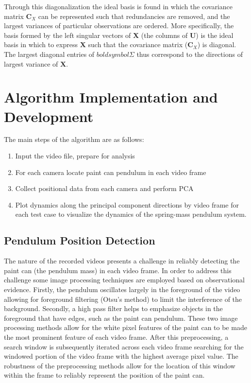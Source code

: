 \documentclass{article}
\begin{document}
Through this diagonalization the ideal basis is found in which the covariance matrix $\mathbf{C}_{X}$ can be represented such that redundancies are removed, and the largest variances of particular observations are ordered. More specifically, the basis formed by the left singular vectors of $\mathbf{X}$ (the columns of $\mathbf{U}$) is the ideal basis in which to express $\mathbf{X}$ such that the covariance matrix ($\mathbf{C}_{X}$) is diagonal. The largest diagonal entries of $boldsymbol{\Sigma}$ thus correspond to the directions of largest variance of $\mathbf{X}$.

\section{Algorithm Implementation and Development}
The main steps of the algorithm are as follows: 
\begin{enumerate}
    \item Input the video file, prepare for analysis
    \item For each camera locate paint can pendulum in each video frame
    \item Collect positional data from each camera and perform PCA
    \item Plot dynamics along the principal component directions by video frame for each test case to visualize the dynamics of the spring-mass pendulum system.
\end{enumerate}

\subsection{Pendulum Position Detection}
The nature of the recorded videos presents a challenge in reliably detecting the paint can (the pendulum mass) in each video frame. In order to address this challenge some image processing techniques are employed based on observational evidence. Firstly, the pendulum oscillates largely in the foreground of the video allowing for foreground filtering (Otsu's method) to limit the interference of the background. Secondly, a high pass filter helps to emphasize objects in the foreground that have edges, such as the paint can pendulum. These two image processing methods allow for the white pixel features of the paint can to be made the most prominent feature of each video frame. After this preprocessing, a search window is subsequently iterated across each video frame searching for the windowed portion of the video frame with the highest average pixel value. The robustness of the preprocessing methods allow for the location of this window within the frame to reliably represent the position of the paint can.
\end{document}
